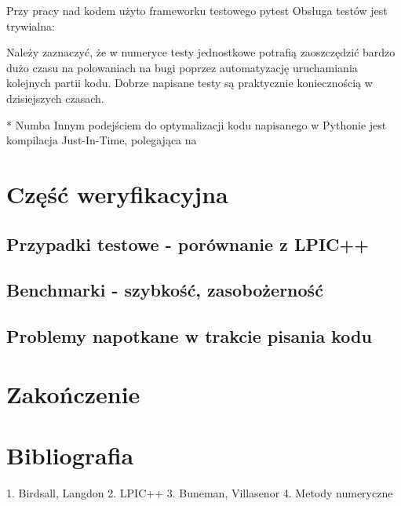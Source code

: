 Przy pracy nad kodem użyto frameworku testowego pytest %
Obsługa testów jest trywialna:

Należy zaznaczyć, że w numeryce testy jednostkowe potrafią zaoszczędzić bardzo dużo czasu na polowaniach na bugi
poprzez automatyzację uruchamiania kolejnych partii kodu. Dobrze napisane testy są praktycznie koniecznością w dzisiejszych
czasach. %

* Numba
Innym podejściem do optymalizacji kodu napisanego w Pythonie jest kompilacja Just-In-Time, polegająca na %


\section{Część weryfikacyjna} %
\subsection{Przypadki testowe - porównanie z LPIC++}
\subsection{Benchmarki - szybkość, zasobożerność} %
\subsection{Problemy napotkane w trakcie pisania kodu}
\section{Zakończenie} %
\section{Bibliografia} %
1. Birdsall, Langdon
2. LPIC++
3. Buneman, Villasenor
4. Metody numeryczne


